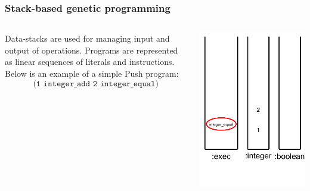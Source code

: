 \documentclass{beamer}
\newcommand{\linespace}{\vskip 0.25cm}
\begin{document}
\begin{frame}
	\frametitle{Stack-based genetic programming}
	\begin{columns}
		\begin{column}{0.65\textwidth}
			Data-stacks are used for managing input and output of operations.
			\linespace
			\linespace
			\linespace
			Programs are represented as linear sequences of literals and instructions. Below is an example of a simple Push program:
			\[\texttt{(1 integer\_add 2 integer\_equal)}\]
		\end{column}
		\begin{column}{0.35\textwidth}
			\includegraphics[height=.7\textheight]{Illustrations/stack_5.PDF}
		\end{column}
	\end{columns}
\end{frame}
\end{document}
